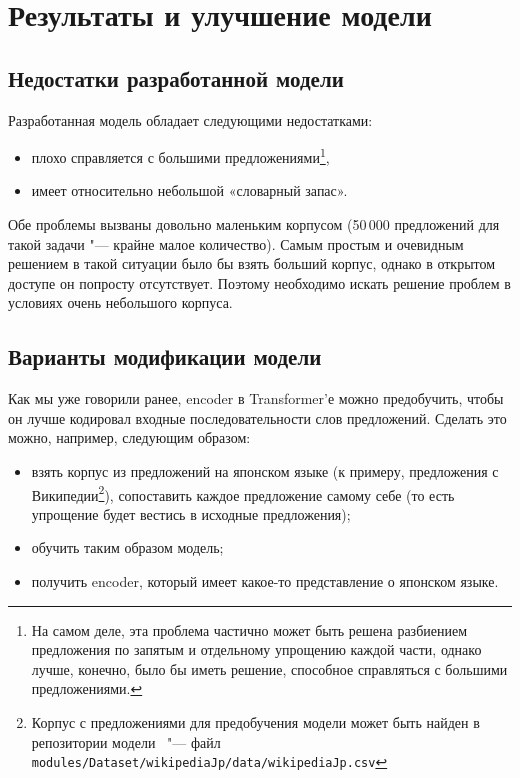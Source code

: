 

\chapter{Результаты и улучшение модели}


\section{Недостатки разработанной модели}


Разработанная модель обладает следующими недостатками:
\begin{itemize}%
  \item плохо справляется с большими предложениями\footnote{На самом деле, эта проблема частично может быть решена разбиением предложения по запятым и отдельному упрощению каждой части, однако лучше, конечно, было бы иметь решение, способное справляться с большими предложениями.},
  \item имеет относительно небольшой «словарный запас».
\end{itemize}

Обе проблемы вызваны довольно маленьким корпусом (50\,000 предложений для такой задачи "--- крайне малое количество).
Самым простым и очевидным решением в такой ситуации было бы взять больший корпус, однако в открытом доступе он попросту отсутствует.
Поэтому необходимо искать решение проблем в условиях очень небольшого корпуса.


\section{Варианты модификации модели}


Как мы уже говорили ранее, encoder в Transformer'е можно предобучить, чтобы он лучше кодировал входные последовательности слов предложений.
Сделать это можно, например, следующим образом:
\begin{itemize}%
  \item взять корпус из предложений на японском языке (к примеру, предложения с Википедии\footnote{Корпус с предложениями для предобучения модели может быть найден в репозитории модели~\cite{ServerGithub} "--- файл \texttt{modules/Dataset/wikipediaJp/data/wikipediaJp.csv}}), сопоставить каждое предложение самому себе (то есть упрощение будет вестись в исходные предложения);
  \item обучить таким образом модель;
  \item получить encoder, который имеет какое-то представление о японском языке.
\end{itemize}


